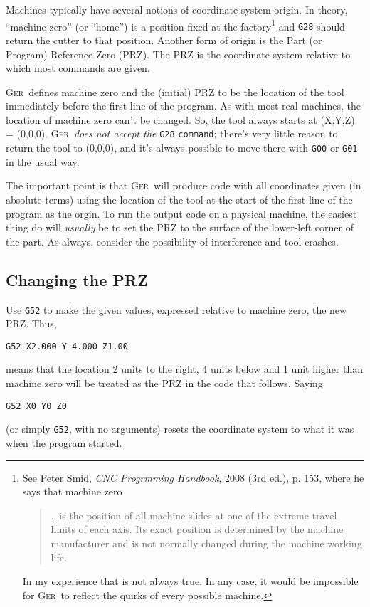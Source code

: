 \documentclass[titlepage,oneside,10pt]{article}
\newcommand{\ger}{\textsc{Ger}}
\begin{document}
Machines typically have several notions of coordinate system
origin. In theory, ``machine zero'' (or ``home'') is a 
position fixed at the factory\footnote{See Peter
Smid, \emph{CNC Progrmming Handbook}, 2008 (3rd ed.), p. 153, where he
says that machine zero
\begin{quote}
  ...is the position of all machine slides at one of the extreme
  travel limits of each axis. Its exact position is determined by the
  machine manufacturer and is not normally changed during the machine
  working life.
  \end{quote}
In my experience that is not always true. In any case, it would be
impossible for \ger\ to reflect the quirks of every possible machine. }
and {\tt G28} should return the cutter to that position. Another form
of origin is the Part (or Program) Reference Zero (PRZ). The PRZ is
the coordinate system relative to which most commands are given.

\ger\ defines machine zero and the (initial) PRZ to be the location of
the tool immediately before the first line of the program. As with
most real machines, the location of machine zero can't be changed. So,
the tool always starts at (X,Y,Z) = (0,0,0). \ger\ \emph{does not
accept the} {\tt G28} {\tt command}; there's very little reason to
return the tool to (0,0,0), and it's always possible to move there
with {\tt G00} or {\tt G01} in the usual way.

The important point is that \ger\ will produce code with all coordinates
given (in absolute terms) using the location of the tool at the start
of the first line of the program as the orgin. To run the output code
on a physical machine, the easiest thing do will {\it usually} be to
set the PRZ to the surface of the lower-left corner of the part. As
always, consider the possibility of interference and tool crashes.

\subsection{Changing the PRZ}

Use {\tt G52} to make the given values, expressed relative to machine
zero, the new PRZ. Thus, 
\begin{verbatim}
G52 X2.000 Y-4.000 Z1.00
\end{verbatim}
means that the location 2 units to the right, 4 units below and 1 unit
higher than machine zero will be treated as the PRZ in the code that
follows. Saying
\begin{verbatim}
G52 X0 Y0 Z0
\end{verbatim}
(or simply {\tt G52}, with no arguments) resets the coordinate system
to what it was when the program started.
\end{document}
